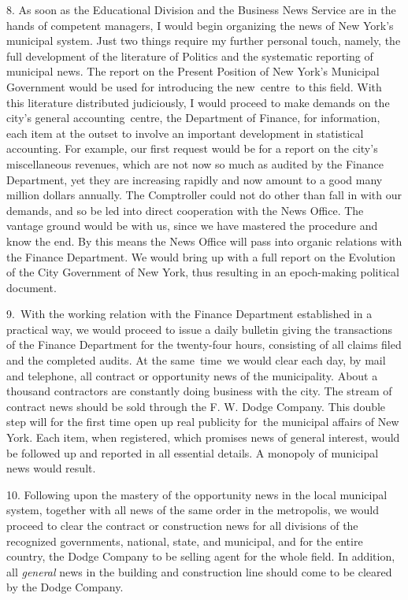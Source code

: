 \documentclass[openany,nobib]{tufte-book}
\begin{document}
8. As soon as the Educational Division and the Business News Service are
in the hands of competent managers, I would begin organizing the news of
New York's municipal system. Just two things require my further personal
touch, namely, the full development of the literature of Politics and
the systematic reporting of municipal news. The report on the Present
Position of New York's Municipal Government would be used for
introducing the new~centre~to this field. With this literature
distributed judiciously, I would proceed to make demands on the city's
general accounting~centre, the Department of Finance, for information,
each item at the outset to involve an important development in
statistical accounting. For example, our first request would be for a
report on the city's miscellaneous revenues, which are not now so much
as audited by the Finance Department, yet they are increasing rapidly
and now amount to a good many million dollars annually. The Comptroller
could not do other than fall in with our demands, and so be led into
direct cooperation with the News Office. The vantage ground would be
with us, since we have mastered the procedure and know the end. By this
means the News Office will pass into organic relations with the Finance
Department. We would bring up with a full report on the Evolution of the
City Government of New York, thus resulting in an epoch-making political
document.~

9.~With the working relation with the Finance Department established in
a practical way, we would proceed to issue a daily bulletin giving the
transactions of the Finance Department for the twenty-four hours,
consisting of all claims filed and the completed audits. At the
same~time~we would clear each day, by mail and telephone, all contract
or opportunity news of the municipality. About a thousand contractors
are constantly doing business with the city. The stream of contract news
should be sold through the F. W. Dodge Company. This double step will
for the first time open up real publicity for~the municipal affairs of
New York. Each item, when registered, which promises news of general
interest, would be followed up and reported in all essential details. A
monopoly of municipal news would result.~

10. Following upon the mastery of the opportunity news in the local
municipal system, together with all news of the same order in the
metropolis, we would proceed to clear the contract or construction news
for all divisions of the recognized governments, national, state, and
municipal, and for the entire country, the Dodge Company to be selling
agent for the whole field. In addition, all \emph{general} news in the
building and construction line should come to be cleared by the Dodge
Company.~
\end{document}
